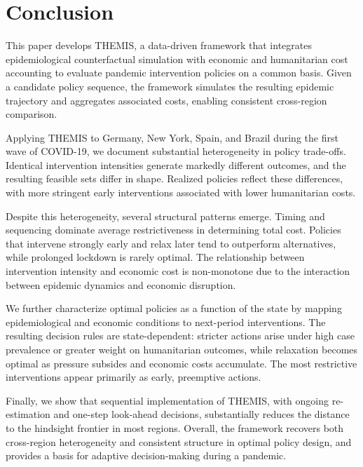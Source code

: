 \documentclass[msom,blindrev]{informs3} %
\begin{document}
\section{Conclusion}
\label{sec:conclusion}
{\color{blue}
This paper develops THEMIS, a data-driven framework that integrates epidemiological counterfactual simulation with economic and humanitarian cost accounting to evaluate pandemic intervention policies on a common basis. Given a candidate policy sequence, the framework simulates the resulting epidemic trajectory and aggregates associated costs, enabling consistent cross-region comparison.

Applying THEMIS to Germany, New York, Spain, and Brazil during the first wave of COVID-19, we document substantial heterogeneity in policy trade-offs. Identical intervention intensities generate markedly different outcomes, and the resulting feasible sets differ in shape. Realized policies reflect these differences, with more stringent early interventions associated with lower humanitarian costs.

Despite this heterogeneity, several structural patterns emerge. Timing and sequencing dominate average restrictiveness in determining total cost. Policies that intervene strongly early and relax later tend to outperform alternatives, while prolonged lockdown is rarely optimal. The relationship between intervention intensity and economic cost is non-monotone due to the interaction between epidemic dynamics and economic disruption.

We further characterize optimal policies as a function of the state by mapping epidemiological and economic conditions to next-period interventions. The resulting decision rules are state-dependent: stricter actions arise under high case prevalence or greater weight on humanitarian outcomes, while relaxation becomes optimal as pressure subsides and economic costs accumulate. The most restrictive interventions appear primarily as early, preemptive actions.

Finally, we show that sequential implementation of THEMIS, with ongoing re-estimation and one-step look-ahead decisions, substantially reduces the distance to the hindsight frontier in most regions. Overall, the framework recovers both cross-region heterogeneity and consistent structure in optimal policy design, and provides a basis for adaptive decision-making during a pandemic.
}

\clearpage
\end{document}
